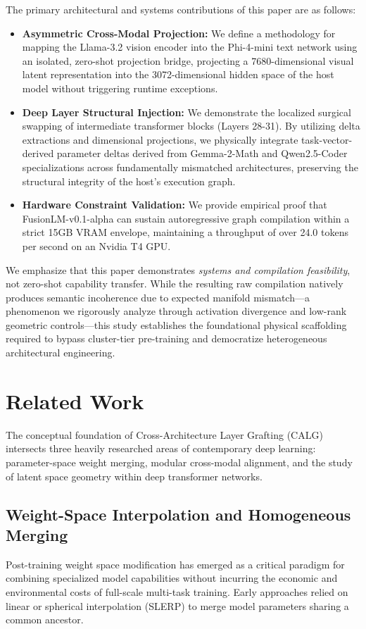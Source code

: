 \documentclass[11pt]{article}
\begin{document}
The primary architectural and systems contributions of this paper are as follows:
\begin{itemize}
    \item \textbf{Asymmetric Cross-Modal Projection:} We define a methodology for mapping the Llama-3.2 vision encoder into the Phi-4-mini text network using an isolated, zero-shot projection bridge, projecting a 7680-dimensional visual latent representation into the 3072-dimensional hidden space of the host model without triggering runtime exceptions.
    \item \textbf{Deep Layer Structural Injection:} We demonstrate the localized surgical swapping of intermediate transformer blocks (Layers 28-31). By utilizing delta extractions and dimensional projections, we physically integrate task-vector-derived parameter deltas derived from Gemma-2-Math and Qwen2.5-Coder specializations across fundamentally mismatched architectures, preserving the structural integrity of the host's execution graph.
    \item \textbf{Hardware Constraint Validation:} We provide empirical proof that FusionLM-v0.1-alpha can sustain autoregressive graph compilation within a strict 15GB VRAM envelope, maintaining a throughput of over 24.0 tokens per second on an Nvidia T4 GPU.
\end{itemize}

We emphasize that this paper demonstrates \textit{systems and compilation feasibility}, not zero-shot capability transfer. While the resulting raw compilation natively produces semantic incoherence due to expected manifold mismatch—a phenomenon we rigorously analyze through activation divergence and low-rank geometric controls—this study establishes the foundational physical scaffolding required to bypass cluster-tier pre-training and democratize heterogeneous architectural engineering.

\section{Related Work}
The conceptual foundation of Cross-Architecture Layer Grafting (CALG) intersects three heavily researched areas of contemporary deep learning: parameter-space weight merging, modular cross-modal alignment, and the study of latent space geometry within deep transformer networks. 

\subsection{Weight-Space Interpolation and Homogeneous Merging}
Post-training weight space modification has emerged as a critical paradigm for combining specialized model capabilities without incurring the economic and environmental costs of full-scale multi-task training. Early approaches relied on linear or spherical interpolation (SLERP) to merge model parameters sharing a common ancestor. 
\end{document}
